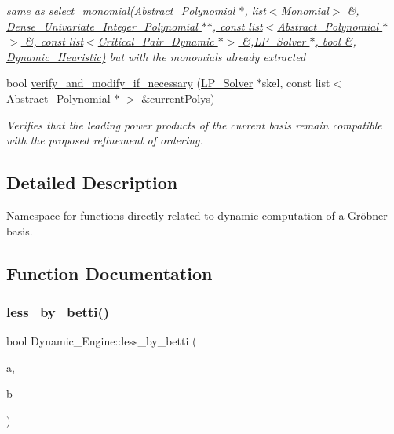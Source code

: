 \begin{DoxyCompactItemize}
\begin{DoxyCompactList}\small\item\em same as {\ttfamily \hyperlink{group___g_b_computation_gaa01d88c431b84deabf51ee116d7d2a0e}{select\+\_\+monomial(\+Abstract\+\_\+\+Polynomial $\ast$, list$<$\+Monomial$>$ \&, Dense\+\_\+\+Univariate\+\_\+\+Integer\+\_\+\+Polynomial $\ast$$\ast$, const list$<$\+Abstract\+\_\+\+Polynomial $\ast$$>$ \&, const list$<$\+Critical\+\_\+\+Pair\+\_\+\+Dynamic $\ast$$>$ \&,\+L\+P\+\_\+\+Solver $\ast$, bool \&, Dynamic\+\_\+\+Heuristic)}} but with the monomials already extracted \end{DoxyCompactList}\item 
bool \hyperlink{group___g_b_computation_gaf3c21c23093fae5467dd770f790540f6}{verify\+\_\+and\+\_\+modify\+\_\+if\+\_\+necessary} (\hyperlink{group___c_l_s_solvers_class_l_p___solvers_1_1_l_p___solver}{L\+P\+\_\+\+Solver} $\ast$skel, const list$<$ \hyperlink{group__polygroup_class_abstract___polynomial}{Abstract\+\_\+\+Polynomial} $\ast$ $>$ \&current\+Polys)
\begin{DoxyCompactList}\small\item\em Verifies that the leading power products of the current basis remain compatible with the proposed refinement of ordering. \end{DoxyCompactList}\end{DoxyCompactItemize}


\subsection{Detailed Description}
Namespace for functions directly related to dynamic computation of a Gr\"{o}bner basis. 

\subsection{Function Documentation}
\mbox{\label{namespace_dynamic___engine_ae09287ccff877cf16afbde841c738b9b}} 
\subsubsection{\texorpdfstring{less\+\_\+by\+\_\+betti()}{less\_by\_betti()}}
{\footnotesize\ttfamily bool Dynamic\+\_\+\+Engine\+::less\+\_\+by\+\_\+betti (\begin{DoxyParamCaption}\item[{\hyperlink{group___g_b_computation_class_dynamic___engine_1_1_p_p___with___ideal}{P\+P\+\_\+\+With\+\_\+\+Ideal} \&}]{a,  }\item[{\hyperlink{group___g_b_computation_class_dynamic___engine_1_1_p_p___with___ideal}{P\+P\+\_\+\+With\+\_\+\+Ideal} \&}]{b }\end{DoxyParamCaption})}



